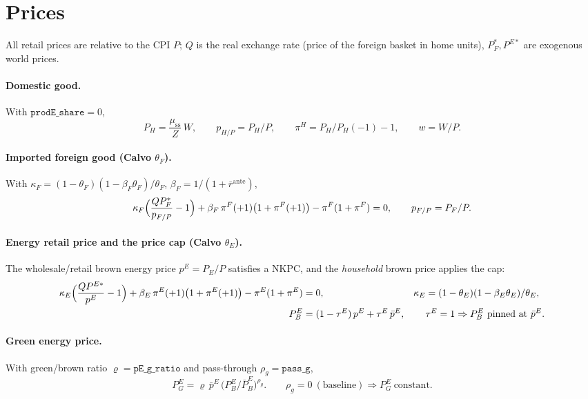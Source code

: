 \documentclass[11pt]{article}
\newcommand{\stst}{\mathrm{ss}}
\newcommand{\PEB}{P^{E}_{B}}
\newcommand{\PEG}{P^{E}_{G}}
\newcommand{\pE}{p^{E}}
\begin{document}
\section{Prices}\label{sec:prices}

All retail prices are relative to the CPI $P$; $Q$ is the real exchange rate
(price of the foreign basket in home units), $P^{*}_{F},P^{E*}$ are exogenous
world prices.

\paragraph{Domestic good.} With $\texttt{prodE\_share}=0$,
\begin{equation}
P_H=\frac{\mu_{\stst}}{Z}\,W,\qquad
p_{H/P}=P_H/P,\qquad
\pi^{H}=P_H/P_H(-1)-1,\qquad w=W/P.
\end{equation}

\paragraph{Imported foreign good (Calvo $\theta_F$).} With
$\kappa_F=(1-\theta_F)(1-\beta_F\theta_F)/\theta_F$, $\beta_F=1/(1+\bar r^{\text{ante}})$,
\begin{equation}
\kappa_F\Bigl(\frac{Q P^{*}_{F}}{p_{F/P}}-1\Bigr)
+\beta_F\,\pi^{F}(+1)\bigl(1+\pi^{F}(+1)\bigr)
-\pi^{F}(1+\pi^{F})=0,\qquad p_{F/P}=P_F/P .
\end{equation}

\paragraph{Energy retail price and the price cap (Calvo $\theta_E$).} The
wholesale/retail brown energy price $\pE=P_E/P$ satisfies a NKPC, and the
\emph{household} brown price applies the cap:
\begin{align}
\kappa_E\Bigl(\frac{Q P^{E*}}{\pE}-1\Bigr)
+\beta_E\,\pi^{E}(+1)\bigl(1+\pi^{E}(+1)\bigr)
-\pi^{E}(1+\pi^{E})&=0,
& \kappa_E&=(1-\theta_E)(1-\beta_E\theta_E)/\theta_E,\\
\PEB &= (1-\tau^{E})\,\pE+\tau^{E}\,\bar\pE,
&& \tau^{E}=1\Rightarrow \PEB\ \text{pinned at }\bar\pE .
\label{eq:cap}
\end{align}

\paragraph{Green energy price.} With green/brown ratio $\varrho=\texttt{pE\_g\_ratio}$
and pass-through $\rho_g=\texttt{pass\_g}$,
\begin{equation}
\PEG=\varrho\,\bar\pE\,\bigl(\PEB/\bar\PEB\bigr)^{\rho_g}.
\qquad \rho_g=0\ (\text{baseline})\Rightarrow \PEG\ \text{constant.}
\label{eq:pEG}
\end{equation}
\end{document}
